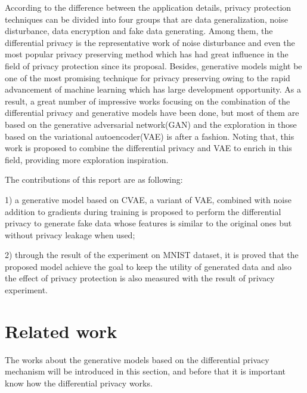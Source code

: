 \documentclass[conference]{IEEEtran}
\begin{document}
According to the difference between the application details, privacy protection techniques can be divided into four groups that are data generalization, noise disturbance, data encryption and fake data generating. Among them, the differential privacy is the representative work of noise disturbance and even the most popular privacy preserving method which has had great influence in the field of privacy protection since its proposal. Besides, generative models might be one of the most promising technique for privacy preserving owing to the rapid advancement of machine learning which has large development opportunity. As a result, a great number of impressive works focusing on the combination of the differential privacy and generative models have been done, but most of them are based on the generative adversarial network(GAN) and the exploration in those based on the variational autoencoder(VAE) is after a fashion. Noting that, this work is proposed to combine the differential privacy and VAE to enrich in this field, providing more exploration inspiration. 

The contributions of this report are as following: 

1) a generative model based on CVAE, a variant of VAE, combined with noise addition to gradients during training is proposed to perform the differential privacy to generate fake data whose features is similar to the original ones but without privacy leakage when used; 

2) through the result of the experiment on MNIST dataset, it is proved that the proposed model achieve the goal to keep the utility of generated data and also the effect of privacy protection is also measured with the result of privacy experiment.

\section{Related work}
The works about the generative models based on the differential privacy mechanism will be introduced in this section, and before that it is important know how the differential privacy works.
\end{document}
